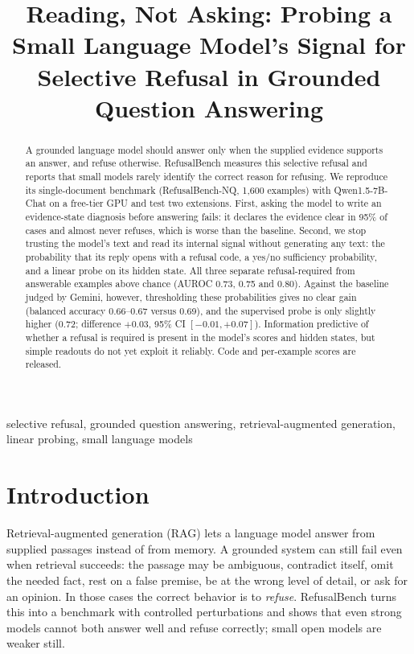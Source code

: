 \documentclass[conference]{IEEEtran}
\begin{document}
\title{Reading, Not Asking: Probing a Small Language Model's Signal for Selective Refusal in Grounded Question Answering}

\author{
}

\maketitle

\begin{abstract}
A grounded language model should answer only when the supplied evidence supports an answer, and refuse otherwise. RefusalBench measures this selective refusal and reports that small models rarely identify the correct reason for refusing. We reproduce its single-document benchmark (RefusalBench-NQ, 1{,}600 examples) with Qwen1.5-7B-Chat on a free-tier GPU and test two extensions. First, asking the model to write an evidence-state diagnosis before answering fails: it declares the evidence clear in 95\% of cases and almost never refuses, which is worse than the baseline. Second, we stop trusting the model's text and read its internal signal without generating any text: the probability that its reply opens with a refusal code, a yes/no sufficiency probability, and a linear probe on its hidden state. All three separate refusal-required from answerable examples above chance (AUROC 0.73, 0.75 and 0.80). Against the baseline judged by Gemini, however, thresholding these probabilities gives no clear gain (balanced accuracy 0.66--0.67 versus 0.69), and the supervised probe is only slightly higher (0.72; difference $+0.03$, 95\% CI $[-0.01,+0.07]$). Information predictive of whether a refusal is required is present in the model's scores and hidden states, but simple readouts do not yet exploit it reliably. Code and per-example scores are released.
\end{abstract}

\begin{IEEEkeywords}
selective refusal, grounded question answering, retrieval-augmented generation, linear probing, small language models
\end{IEEEkeywords}

\section{Introduction}
Retrieval-augmented generation (RAG) \cite{lewis2020retrieval} lets a language model answer from supplied passages instead of from memory. A grounded system can still fail even when retrieval succeeds: the passage may be ambiguous, contradict itself, omit the needed fact, rest on a false premise, be at the wrong level of detail, or ask for an opinion. In those cases the correct behavior is to \emph{refuse}. RefusalBench \cite{muhamed2026refusalbench} turns this into a benchmark with controlled perturbations and shows that even strong models cannot both answer well and refuse correctly; small open models are weaker still.
\end{document}
